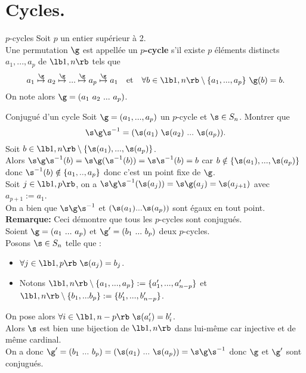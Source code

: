 \documentclass[11pt]{article}
\begin{document}
\section{Cycles.}

\begin{defi}{$p$-cycles}{}
    Soit $p$ un entier supérieur à 2.\\
    Une permutation $\g$ est appellée un $p$\textbf{-cycle} s'il existe $p$ éléments distincts $a_1,...,a_p$ de $\lb1,n\rb$ tels que
    \begin{equation*}
        a_1\overset{\g}{\mapsto}a_2\overset{\g}{\mapsto}...\overset{\g}{\mapsto}a_p\overset{\g}{\mapsto}a_1 \quad \text{et} \quad \forall b \in \lb1,n\rb\setminus\{a_1,...,a_p\} ~ \g(b)=b.
    \end{equation*}
    On note alors $\g=(a_1~a_2~...~a_p)$.
\end{defi}

\vspace*{0.3cm}

\begin{ex}{Conjugué d'un cycle}{}
    Soit $\g=(a_1,...,a_p)$ un $p$-cycle et $\s\in S_n$. Montrer que
    \begin{equation*}
        \s\g\s^{-1}=(\s(a_1)~\s(a_2)~...~\s(a_p)).
    \end{equation*}
    \tcblower
    Soit $b\in\lb1,n\rb\setminus\{\s(a_1),...,\s(a_p)\}$.\\
    Alors $\s\g\s^{-1}(b)=\s\g(\s^{-1}(b))=\s\s^{-1}(b)=b$ car $b\notin\{\s(a_1),...,\s(a_p)\}$ donc $\s^{-1}(b)\notin\{a_1,..,a_p\}$ donc c'est un point fixe de $\g$.\\
    Soit $j\in\lb1,p\rb$, on a $\s\g\s^{-1}(\s(a_j))=\s\g(a_j)=\s(a_{j+1})$ avec $a_{p+1}:=a_1$.\\
    On a bien que $\s\g\s^{-1}$ et $(\s(a_1)...\s(a_p))$ sont égaux en tout point.\\
    \textbf{Remarque:} Ceci démontre que tous les $p$-cycles sont conjugués.\\
    Soient $\g=(a_1~...~a_p)$ et $\g'=(b_1~...~b_p)$ deux $p$-cycles.\\
    Posons $\s\in S_n$ telle que :
    \begin{itemize}
        \item $\forall j \in \lb 1, p \rb ~ \s(a_j) = b_j$.
        \item Notons $\lb 1, n \rb \setminus \{a_1, ..., a_p\} := \{a_1', ..., a_{n-p}'\}$ et $\lb 1, n \rb \setminus \{b_1, ... b_p\} := \{b_1', ... , b_{n-p}'\}$.
    \end{itemize}
    On pose alors $\forall i\in\lb1,n-p\rb ~ \s(a_i')=b_i'$.\\
    Alors $\s$ est bien une bijection de $\lb1,n\rb$ dans lui-même car injective et de même cardinal.\\
    On a donc $\g'=(b_1~...~b_p) = (\s(a_1)~...~\s(a_p))=\s\g\s^{-1}$ donc $\g$ et $\g'$ sont conjugués.
\end{ex}
\end{document}
